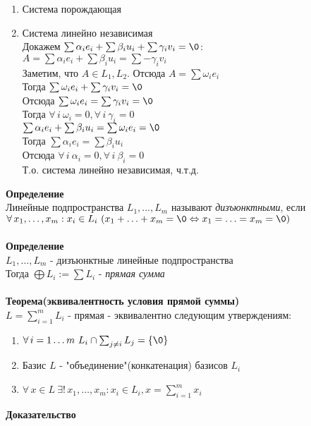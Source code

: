 \documentclass[12pt]{article}
\begin{document}
\begin{enumerate}
    \item Система порождающая
    \item Система линейно независимая\\
    Докажем $\sum \alpha_i e_i + \sum \beta_i u_i + \sum \gamma_i v_i = \0$:\\
    $A = \sum \alpha_i e_i + \sum \beta_i u_i = \sum -\gamma_i v_i$\\
    Заметим, что $A \in L_1, L_2$. Отсюда $A = \sum \omega_i e_i$\\
    Тогда $\sum \omega_i e_i + \sum \gamma_i v_i = \0$\\
    Отсюда $\sum \omega_i e_i = \sum \gamma_i v_i = \0$\\
    Тогда $\forall\,i\ \omega_i = 0, \forall\,i\ \gamma_i = 0$\\
    $\sum \alpha_i e_i + \sum \beta_i u_i = \sum \omega_i e_i = \0$\\
    Тогда $\sum \alpha_i e_i = \sum \beta_i u_i$\\
    Отсюда $\forall\,i\ \alpha_i = 0, \forall\,i\ \beta_i = 0$\\
    Т.о. система линейно независимая, ч.т.д.\\
\end{enumerate}
\textbf{Определение}\\
Линейные подпространства $L_1,\ldots,L_m$ называют \textit{дизъюнктными}, если $\forall\,x_1,\ldots,x_m: x_i\in L_i\ (x_1+\ldots+x_m = \0 \Leftrightarrow x_1=\ldots=x_m=\0)$\\\\
\textbf{Определение}\\
$L_1,\ldots,L_m$ - дизъюнктные линейные подпространства\\
Тогда $\bigoplus L_i := \sum L_i$ - \textit{прямая сумма}\\\\
\textbf{Теорема(эквивалентность условия прямой суммы)}\\
$L=\sum_{i=1}^m L_i$ - прямая - эквивалентно следующим утверждениям:
\begin{enumerate}
    \item $\forall\,i=1\ldots m\ L_i \cap \sum_{j\neq i} L_j = \{\0\}$
    \item Базис $L$ - "объединение"(конкатенация) базисов $L_i$
    \item $\forall\,x\in L\ \exists!\, x_1,\ldots,x_m: x_i \in L_i, x = \sum_{i=1}^m x_i$
\end{enumerate}
\textbf{Доказательство}\\
\end{document}

